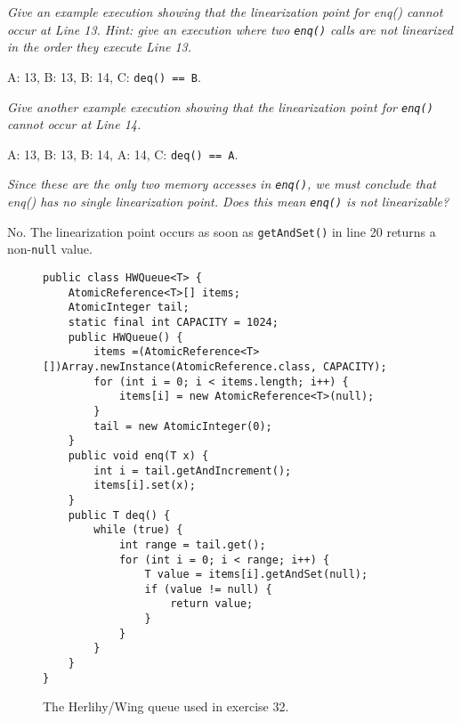 \documentclass[a4paper,10pt]{article}
\begin{document}
\emph{Give an example execution showing that the linearization point for enq()
cannot occur at Line 13. Hint: give an execution where two \lstinline|enq()|
calls are not linearized in the order they execute Line 13.}

\vspace{3mm}

A: 13, B: 13, B: 14, C: \lstinline|deq() == B|.

\vspace{3mm}

\emph{Give another example execution showing that the linearization point for \lstinline|enq()|
cannot occur at Line 14.}

\vspace{3mm}

A: 13, B: 13, B: 14, A: 14, C: \lstinline|deq() == A|.

\vspace{3mm}

\emph{Since these are the only two memory accesses in \lstinline|enq()|, we must conclude that
enq() has no single linearization point. Does this mean \lstinline|enq()| is not linearizable?}

\vspace{3mm}

No. The linearization point occurs as soon as \lstinline|getAndSet()| in line 20
returns a non-\lstinline|null| value.

\begin{figure}
\begin{lstlisting}
public class HWQueue<T> {
    AtomicReference<T>[] items;
    AtomicInteger tail;
    static final int CAPACITY = 1024;
    public HWQueue() {
        items =(AtomicReference<T>[])Array.newInstance(AtomicReference.class, CAPACITY);
        for (int i = 0; i < items.length; i++) {
            items[i] = new AtomicReference<T>(null);
        }
        tail = new AtomicInteger(0);
    }
    public void enq(T x) {
        int i = tail.getAndIncrement();
        items[i].set(x);
    }
    public T deq() {
        while (true) {
            int range = tail.get();
            for (int i = 0; i < range; i++) {
                T value = items[i].getAndSet(null);
                if (value != null) {
                    return value;
                }
            }
        }
    }
}
\end{lstlisting}
\caption{The Herlihy/Wing queue used in exercise 32.}
\label{fig:nonlinearizablequeue}
\end{figure}
\end{document}
